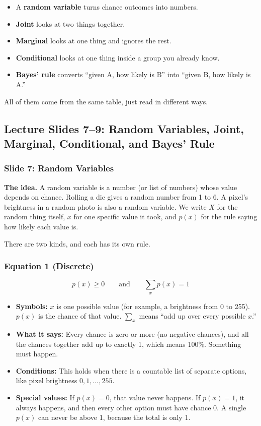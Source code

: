\begin{itemize}
  \item A \textbf{random variable} turns chance outcomes into numbers.
  \item \textbf{Joint} looks at two things together.
  \item \textbf{Marginal} looks at one thing and ignores the rest.
  \item \textbf{Conditional} looks at one thing inside a group you already know.
  \item \textbf{Bayes' rule} converts ``given A, how likely is B'' into ``given B, how likely is A.''
\end{itemize}

All of them come from the same table, just read in different ways.

\subsection*{Lecture Slides 7--9: Random Variables, Joint, Marginal, Conditional, and Bayes' Rule}

\subsubsection*{Slide 7: Random Variables}

\textbf{The idea.} A random variable is a number (or list of numbers) whose value depends on chance. Rolling a die gives a random number from 1 to 6. A pixel's brightness in a random photo is also a random variable. We write $X$ for the random thing itself, $x$ for one specific value it took, and $p(x)$ for the rule saying how likely each value is.

There are two kinds, and each has its own rule.

\subsubsection*{Equation 1 (Discrete)}

\[
p(x) \ge 0 \qquad \text{and} \qquad \sum_x p(x) = 1
\]

\begin{itemize}
  \item \textbf{Symbols:} $x$ is one possible value (for example, a brightness from 0 to 255). $p(x)$ is the chance of that value. $\sum_x$ means ``add up over every possible $x$.''
  \item \textbf{What it says:} Every chance is zero or more (no negative chances), and all the chances together add up to exactly 1, which means 100\%. Something must happen.
  \item \textbf{Conditions:} This holds when there is a countable list of separate options, like pixel brightness $0, 1, \ldots, 255$.
  \item \textbf{Special values:} If $p(x) = 0$, that value never happens. If $p(x) = 1$, it always happens, and then every other option must have chance 0. A single $p(x)$ can never be above 1, because the total is only 1.
\end{itemize}

